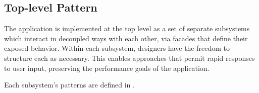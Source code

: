 \subsection{Top-level Pattern}
The application is implemented at the top level as a set of separate subsystems which interact in decoupled ways with each other, via facades that define their exposed behavior.
Within each subsystem, designers have the freedom to structure each as necessary.
This enables approaches that permit rapid responses to user input, preserving the performance goals of the application.

Each subsystem's patterns are defined in .